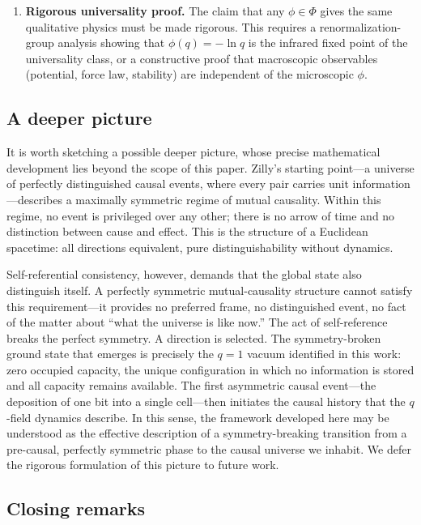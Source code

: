\documentclass[aps,prd,twocolumn,showpacs,superscriptaddress,preprintnumbers]{revtex4-2}
\begin{document}
\begin{enumerate}
    \item \textbf{Rigorous universality proof.} The claim that any $\phi\in\Phi$ gives the same qualitative physics must be made rigorous. This requires a renormalization-group analysis showing that $\phi(q)=-\ln q$ is the infrared fixed point of the universality class, or a constructive proof that macroscopic observables (potential, force law, stability) are independent of the microscopic $\phi$.
\end{enumerate}

\subsection*{A deeper picture}

It is worth sketching a possible deeper picture, whose precise mathematical development lies beyond the scope of this paper. Zilly's starting point---a universe of perfectly distinguished causal events, where every pair carries unit information---describes a maximally symmetric regime of mutual causality. Within this regime, no event is privileged over any other; there is no arrow of time and no distinction between cause and effect. This is the structure of a Euclidean spacetime: all directions equivalent, pure distinguishability without dynamics.

Self-referential consistency, however, demands that the global state also distinguish itself. A perfectly symmetric mutual-causality structure cannot satisfy this requirement---it provides no preferred frame, no distinguished event, no fact of the matter about ``what the universe is like now.'' The act of self-reference breaks the perfect symmetry. A direction is selected. The symmetry-broken ground state that emerges is precisely the $q=1$ vacuum identified in this work: zero occupied capacity, the unique configuration in which no information is stored and all capacity remains available. The first asymmetric causal event---the deposition of one bit into a single cell---then initiates the causal history that the $q$-field dynamics describe. In this sense, the framework developed here may be understood as the effective description of a symmetry-breaking transition from a pre-causal, perfectly symmetric phase to the causal universe we inhabit. We defer the rigorous formulation of this picture to future work.

\subsection*{Closing remarks}
\end{document}
